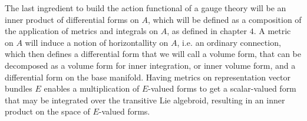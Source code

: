 The last ingredient to build the action functional of a gauge theory will be an inner product of differential forms on $A$, which will be defined as a composition of the application of metrics and integrals on $A$, as defined in chapter $4$. A metric on $A$ will induce a notion of horizontallity on $A$, i.e. an ordinary connection, which then defines a differential form that we will call a volume form, that can be decomposed as a volume form for inner integration, or inner volume form, and a differential form on the base manifold. Having metrics on representation vector bundles $E$ enables a multiplication of $E$-valued forms to get a scalar-valued form that may be integrated over the transitive Lie algebroid, resulting in an inner product on the space of $E$-valued forms.




